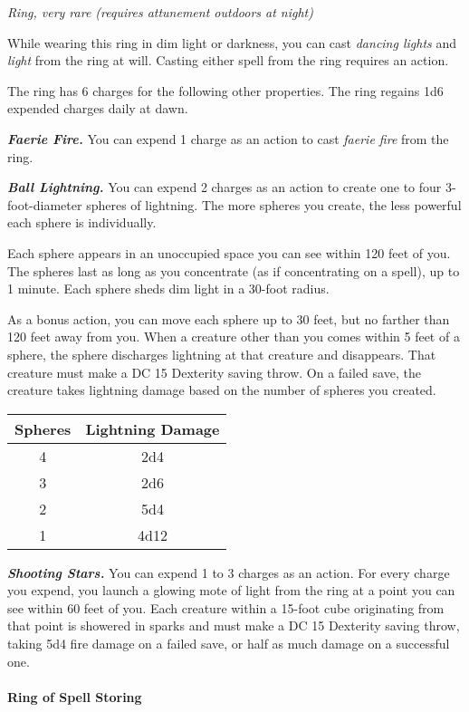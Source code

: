\documentclass[
]{article}
\begin{document}
\emph{Ring, very rare (requires attunement outdoors at night)}

While wearing this ring in dim light or darkness, you can cast
\emph{dancing lights} and \emph{light} from the ring at will. Casting
either spell from the ring requires an action.

The ring has 6 charges for the following other properties. The ring
regains 1d6 expended charges daily at dawn.

\emph{\textbf{Faerie Fire.}} You can expend 1 charge as an action to
cast \emph{faerie fire} from the ring.

\emph{\textbf{Ball Lightning.}} You can expend 2 charges as an action to
create one to four 3-foot-diameter spheres of lightning. The more
spheres you create, the less powerful each sphere is individually.

Each sphere appears in an unoccupied space you can see within 120 feet
of you. The spheres last as long as you concentrate (as if concentrating
on a spell), up to 1 minute. Each sphere sheds dim light in a 30-foot
radius.

As a bonus action, you can move each sphere up to 30 feet, but no
farther than 120 feet away from you. When a creature other than you
comes within 5 feet of a sphere, the sphere discharges lightning at that
creature and disappears. That creature must make a DC 15 Dexterity
saving throw. On a failed save, the creature takes lightning damage
based on the number of spheres you created.

\begin{longtable}[]{@{}cc@{}}
\toprule
Spheres & Lightning Damage\tabularnewline
\midrule
\endhead
4 & 2d4\tabularnewline
3 & 2d6\tabularnewline
2 & 5d4\tabularnewline
1 & 4d12\tabularnewline
\bottomrule
\end{longtable}

\emph{\textbf{Shooting Stars.}} You can expend 1 to 3 charges as an
action. For every charge you expend, you launch a glowing mote of light
from the ring at a point you can see within 60 feet of you. Each
creature within a 15-foot cube originating from that point is showered
in sparks and must make a DC 15 Dexterity saving throw, taking 5d4 fire
damage on a failed save, or half as much damage on a successful one.

\hypertarget{ring-of-spell-storing}{%
\paragraph{Ring of Spell Storing}\label{ring-of-spell-storing}}
\end{document}
